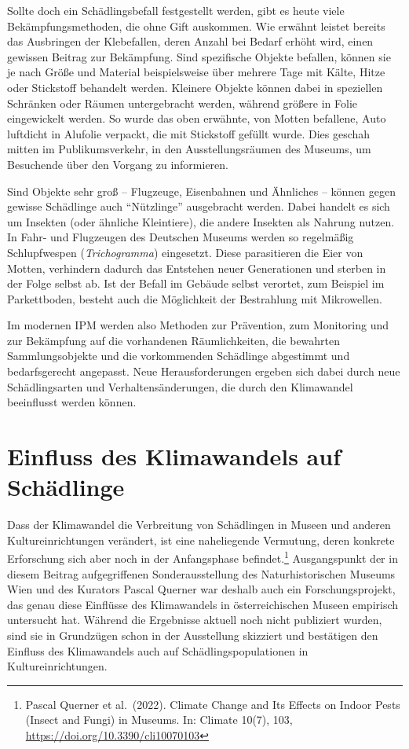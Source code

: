 \documentclass[a4paper,
fontsize=11pt,
oneside,
numbers=noperiodatend,
parskip=half-,
bibliography=totoc,
final
]{scrartcl}
\begin{document}
Sollte doch ein Schädlingsbefall festgestellt werden, gibt es heute
viele Bekämpfungsmethoden, die ohne Gift auskommen. Wie erwähnt leistet
bereits das Ausbringen der Klebefallen, deren Anzahl bei Bedarf erhöht
wird, einen gewissen Beitrag zur Bekämpfung. Sind spezifische Objekte
befallen, können sie je nach Größe und Material beispielsweise über
mehrere Tage mit Kälte, Hitze oder Stickstoff behandelt werden. Kleinere
Objekte können dabei in speziellen Schränken oder Räumen untergebracht
werden, während größere in Folie eingewickelt werden. So wurde das oben
erwähnte, von Motten befallene, Auto luftdicht in Alufolie verpackt, die
mit Stickstoff gefüllt wurde. Dies geschah mitten im Publikumsverkehr,
in den Ausstellungsräumen des Museums, um Besuchende über den Vorgang zu
informieren.

Sind Objekte sehr groß -- Flugzeuge, Eisenbahnen und Ähnliches -- können
gegen gewisse Schädlinge auch \enquote{Nützlinge} ausgebracht werden.
Dabei handelt es sich um Insekten (oder ähnliche Kleintiere), die andere
Insekten als Nahrung nutzen. In Fahr- und Flugzeugen des Deutschen
Museums werden so regelmäßig Schlupfwespen (\emph{Trichogramma})
eingesetzt. Diese parasitieren die Eier von Motten, verhindern dadurch
das Entstehen neuer Generationen und sterben in der Folge selbst ab. Ist
der Befall im Gebäude selbst verortet, zum Beispiel im Parkettboden,
besteht auch die Möglichkeit der Bestrahlung mit Mikrowellen.

Im modernen IPM werden also Methoden zur Prävention, zum Monitoring und
zur Bekämpfung auf die vorhandenen Räumlichkeiten, die bewahrten
Sammlungsobjekte und die vorkommenden Schädlinge abgestimmt und
bedarfsgerecht angepasst. Neue Herausforderungen ergeben sich dabei
durch neue Schädlingsarten und Verhaltensänderungen, die durch den
Klimawandel beeinflusst werden können.

\section{Einfluss des Klimawandels auf
Schädlinge}\label{einfluss-des-klimawandels-auf-schuxe4dlinge}

Dass der Klimawandel die Verbreitung von Schädlingen in Museen und
anderen Kultureinrichtungen verändert, ist eine naheliegende Vermutung,
deren konkrete Erforschung sich aber noch in der Anfangsphase
befindet.\footnote{Pascal Querner et al.~(2022). Climate Change and Its
  Effects on Indoor Pests (Insect and Fungi) in Museums. In: Climate
  10(7), 103, \url{https://doi.org/10.3390/cli10070103}} Ausgangspunkt
der in diesem Beitrag aufgegriffenen Sonderausstellung des
Naturhistorischen Museums Wien und des Kurators Pascal Querner war
deshalb auch ein Forschungsprojekt, das genau diese Einflüsse des
Klimawandels in österreichischen Museen empirisch untersucht hat.
Während die Ergebnisse aktuell noch nicht publiziert wurden, sind sie in
Grundzügen schon in der Ausstellung skizziert und bestätigen den
Einfluss des Klimawandels auch auf Schädlingspopulationen in
Kultureinrichtungen.
\end{document}
